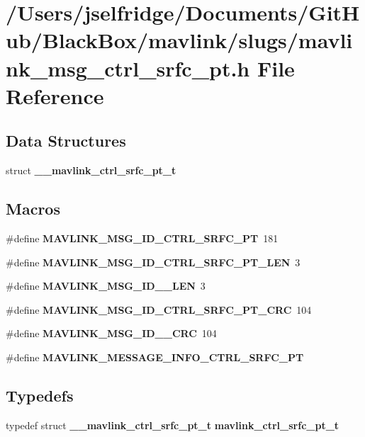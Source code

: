 \section{/\+Users/jselfridge/\+Documents/\+Git\+Hub/\+Black\+Box/mavlink/slugs/mavlink\+\_\+msg\+\_\+ctrl\+\_\+srfc\+\_\+pt.h File Reference}
\label{mavlink__msg__ctrl__srfc__pt_8h}
\subsection*{Data Structures}
\begin{DoxyCompactItemize}
\item 
struct \textbf{ \+\_\+\+\_\+mavlink\+\_\+ctrl\+\_\+srfc\+\_\+pt\+\_\+t}
\end{DoxyCompactItemize}
\subsection*{Macros}
\begin{DoxyCompactItemize}
\item 
\#define \textbf{ M\+A\+V\+L\+I\+N\+K\+\_\+\+M\+S\+G\+\_\+\+I\+D\+\_\+\+C\+T\+R\+L\+\_\+\+S\+R\+F\+C\+\_\+\+PT}~181
\item 
\#define \textbf{ M\+A\+V\+L\+I\+N\+K\+\_\+\+M\+S\+G\+\_\+\+I\+D\+\_\+\+C\+T\+R\+L\+\_\+\+S\+R\+F\+C\+\_\+\+P\+T\+\_\+\+L\+EN}~3
\item 
\#define \textbf{ M\+A\+V\+L\+I\+N\+K\+\_\+\+M\+S\+G\+\_\+\+I\+D\+\_\+\_\+\+L\+EN}~3
\item 
\#define \textbf{ M\+A\+V\+L\+I\+N\+K\+\_\+\+M\+S\+G\+\_\+\+I\+D\+\_\+\+C\+T\+R\+L\+\_\+\+S\+R\+F\+C\+\_\+\+P\+T\+\_\+\+C\+RC}~104
\item 
\#define \textbf{ M\+A\+V\+L\+I\+N\+K\+\_\+\+M\+S\+G\+\_\+\+I\+D\+\_\+\_\+\+C\+RC}~104
\item 
\#define \textbf{ M\+A\+V\+L\+I\+N\+K\+\_\+\+M\+E\+S\+S\+A\+G\+E\+\_\+\+I\+N\+F\+O\+\_\+\+C\+T\+R\+L\+\_\+\+S\+R\+F\+C\+\_\+\+PT}
\end{DoxyCompactItemize}
\subsection*{Typedefs}
\begin{DoxyCompactItemize}
\item 
typedef struct \textbf{ \+\_\+\+\_\+mavlink\+\_\+ctrl\+\_\+srfc\+\_\+pt\+\_\+t} \textbf{ mavlink\+\_\+ctrl\+\_\+srfc\+\_\+pt\+\_\+t}
\end{DoxyCompactItemize}


